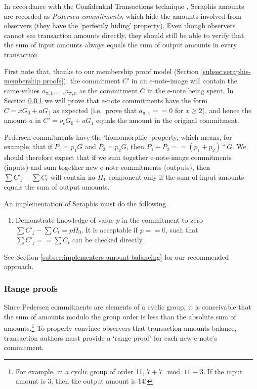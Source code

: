 In accordance with the Confidential Transactions technique \cite{maxwell-ct-2}, Seraphis amounts are recorded as {\em Pedersen commitments}, which hide the amounts involved from observers (they have the `perfectly hiding' property). Even though observers cannot see transaction amounts directly, they should still be able to verify that the sum of input amounts always equals the sum of output amounts in every transaction.

First note that, thanks to our membership proof model (Section \ref{subsec:seraphis-membership proofs}), the commitment $C'$ in an e-note-image will contain the same values $a_{\pi,1},...,a_{\pi,n}$ as the commitment $C$ in the e-note being spent. In Section \ref{subsubsec:confidential-transactions-range-proofs} we will prove that e-note commitments have the form $C = x G_0 + a G_1$ as expected (i.e.\ prove that $a_{\pi,x} == 0$ for $x \geq 2$), and hence the amount $a$ in $C' = v_c G_0 + a G_1$ equals the amount in the original commitment.

Pedersen commitments have the `homomorphic' property, which means, for example, that if $P_1 = p_1 G$ and $P_2 = p_2 G$, then $P_1 + P_2 == (p_1 + p_2)*G$. We should therefore expect that if we sum together e-note-image commitments (inputs) and sum together new e-note commitments (outputs), then $\sum C'_j - \sum C_t$ will contain no $H_1$ component only if the sum of input amounts equals the sum of output amounts.

An implementation of Seraphis must do the following.

\begin{enumerate}
    \item Demonstrate knowledge of value $p$ in the commitment to zero $\sum C'_j - \sum C_t = p H_0$. It is acceptable if $p == 0$, such that $\sum C'_j == \sum C_t$ can be checked directly.
\end{enumerate}

See Section \ref{subsec:implementers-amount-balancing} for our recommended approach.

\subsubsection{Range proofs}
\label{subsubsec:confidential-transactions-range-proofs}

Since Pedersen commitments are elements of a cyclic group, it is conceivable that the sum of amounts modulo the group order is less than the absolute sum of amounts.\footnote{For example, in a cyclic group of order 11, $7 + 7 \mod 11 \equiv 3$. If the input amount is 3, then the output amount is 14!} To properly convince observers that transaction amounts balance, transaction authors must provide a `range proof' for each new e-note's commitment.

